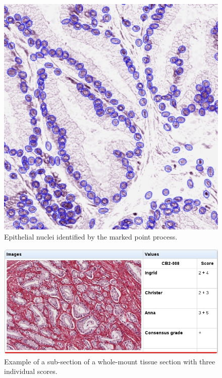 \begin{enumerate}
\begin{figure}
\centering
\includegraphics[width=.5\textwidth]{figures/research/prostate3.jpg}
\caption{Epithelial nuclei identified by the marked point process. \label{fig:prostate3}}
\end{figure}

\begin{figure}
\centering
\includegraphics[width=.9\textwidth]{figures/research/prostate4.jpg}
\caption{Example of a sub-section of a whole-mount tissue section with three individual scores. \label{fig:prostate4}}
\end{figure}

\newpage


\end{enumerate}

